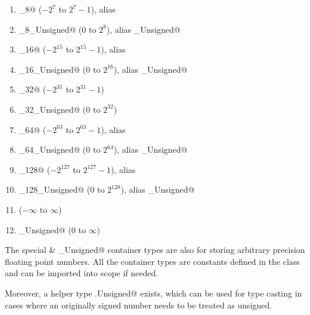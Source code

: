 \begin{enumerate}

  \item \lstinline@Integer_8@ ($-2^{7}$ to $2^{7}-1$), alias \lstinline@Byte@

  \item \lstinline@Integer_8_Unsigned@ ($0$ to $2^{8}$), alias \lstinline@Byte_Unsigned@

  \item \lstinline@Integer_16@ ($-2^{15}$ to $2^{15}-1$), alias \lstinline@Short@

  \item \lstinline@Integer_16_Unsigned@ ($0$ to $2^{16}$), alias \lstinline@Short_Unsigned@

  \item \lstinline@Integer_32@ ($-2^{31}$ to $2^{31}-1$)

  \item \lstinline@Integer_32_Unsigned@ ($0$ to $2^{32}$)

  \item \lstinline@Integer_64@ ($-2^{63}$ to $2^{63}-1$), alias \lstinline@Long@

  \item \lstinline@Integer_64_Unsigned@ ($0$ to $2^{64}$), alias \lstinline@Long_Unsigned@

  \item \lstinline@Integer_128@ ($-2^{127}$ to $2^{127}-1$), alias \lstinline@Cent@

  \item \lstinline@Integer_128_Unsigned@ ($0$ to $2^{128}$), alias \lstinline@Cent_Unsigned@

  \item \lstinline@Decimal@ ($-\infty$ to $\infty$)

  \item \lstinline@Decimal_Unsigned@ ($0$ to $\infty$)

\end{enumerate}

The special \lstinline@Decimal@ \& \lstinline@Decimal_Unsigned@ container types are also for storing arbitrary precision floating point numbers. All the container types are constants defined in the \lstinline@Number@ class and can be imported into scope if needed. 

Moreover, a helper type \lstinline@Number.Unsigned@ exists, which can be used for type casting in cases where an originally signed number needs to be treated as unsigned. 

